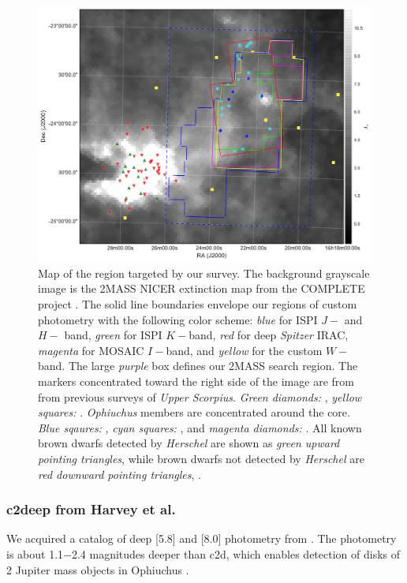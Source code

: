 \documentclass[12pt,preprint]{aastex}
\begin{document}
\begin{figure}[ht!]
\caption{ Map of the region targeted by our survey.  The background grayscale image is the 2MASS NICER extinction map \citep{2008A&A...489..143L} from the COMPLETE project \citep{2006AJ....131.2921R}.  The solid line boundaries envelope our regions of custom photometry with the following color scheme: \emph{blue} for ISPI $J-$ and $H-$ band, \emph{green} for ISPI $K-$band, \emph{red} for deep \emph{Spitzer} IRAC, \emph{magenta} for MOSAIC $I-$band, and \emph{yellow} for the custom $W-$band.  The large \emph{purple} box defines our 2MASS search region.  The markers concentrated toward the right side of the image are from from previous surveys of \emph{Upper Scorpius}. \emph{Green diamonds:} \citet{2012ApJ...758...31L}, \emph{yellow squares:} \cite{2006AJ....131.3016S}.  \emph{Ophiuchus} members are concentrated around the core.  \emph{Blue sqaures:} \cite{2011AJ....142..140E}, \emph{cyan squares:} \cite{2010ApJS..188...75M}, and \emph{magenta diamonds:} \cite{2005AJ....130.1733W}.  All known brown dwarfs detected by \emph{Herschel} are shown as \emph{green upward pointing triangles}, while brown dwarfs not detected by \emph{Herschel} are \emph{red downward pointing triangles}, \cite{2013A&A...559A.126A}. \label{fig_star_chart} }
\centering
\includegraphics[scale=0.5]{figures/Ophiuchus_map}
\end{figure}


\subsubsection{c2deep from Harvey et al.}
We acquired a catalog of deep [5.8] and [8.0] photometry from \citet{2010ApJ...720.1374H}.  The \citet{2010ApJ...720.1374H} photometry is about 1.1$-$2.4 magnitudes deeper than c2d, which enables detection of disks of 2 Jupiter mass objects in Ophiuchus \citep{allers06}.  
\end{document}
